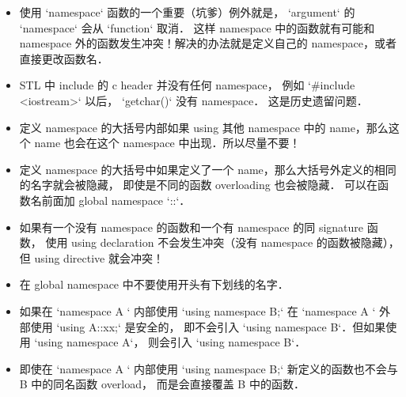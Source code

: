 
\begin{issues}
\issueDraft
\end{issues}

\begin{itemize}
\item 使用 `namespace` 函数的一个重要（坑爹）例外就是， `argument` 的 `namespace` 会从 `function` 取消． 这样 namespace 中的函数就有可能和 namespace 外的函数发生冲突！解决的办法就是定义自己的 namespace，或者直接更改函数名．
\item STL 中 include 的 c header 并没有任何 namespace， 例如 `#include <iostream>` 以后， `getchar()` 没有 namespace． 这是历史遗留问题．
\item 定义 namespace 的大括号内部如果 using 其他 namespace 中的 name，那么这个 name 也会在这个 namespace 中出现．所以尽量不要！
\item 定义 namespace 的大括号中如果定义了一个 name，那么大括号外定义的相同的名字就会被隐藏， 即使是不同的函数 overloading 也会被隐藏． 可以在函数名前面加 global namespace `::`．
\item 如果有一个没有 namespace 的函数和一个有 namespace 的同 signature 函数， 使用 using declaration 不会发生冲突（没有 namespace 的函数被隐藏），但 using directive 就会冲突！
\item 在 global namespace 中不要使用开头有下划线的名字．
\item 如果在 `namespace A {}` 内部使用 `using namespace B;` 在 `namespace A {}` 外部使用 `using A::xx;` 是安全的， 即不会引入 `using namespace B`．但如果使用 `using namespace A`， 则会引入 `using namespace B`．
\item 即使在 `namespace A {}` 内部使用 `using namespace B;`  新定义的函数也不会与 B 中的同名函数 overload， 而是会直接覆盖 B 中的函数．
\end{itemize}
